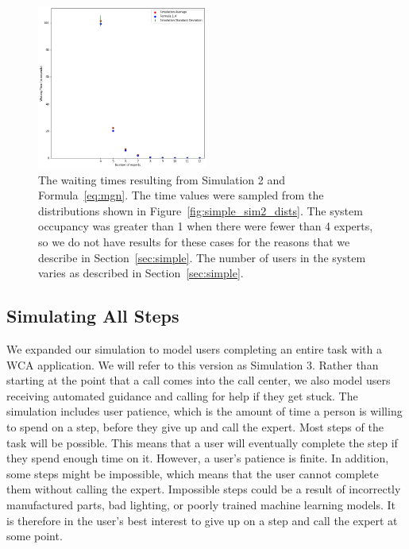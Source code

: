 \begin{figure}[h]
  \includegraphics[width=0.5\textwidth]{figures/montecarlo/independent_calls_lognorm.png}
  \caption{
    The waiting times resulting from Simulation 2 and Formula~\ref{eq:mgn}.
    The time values were sampled from the distributions shown in
    Figure~\ref{fig:simple_sim2_dists}.
    The system occupancy was greater than 1 when there were fewer than 4
    experts, so we do not have results for these cases for the reasons that we
    describe in Section~\ref{sec:simple}.
    The number of users in the system varies as described in
    Section~\ref{sec:simple}.
  }\label{fig:simple_sim2_results}
\end{figure}

\subsection{Simulating All Steps}

We expanded our simulation to model users completing an entire task with a WCA
application.
We will refer to this version as Simulation 3.
Rather than starting at the point that a call comes into the call center, we
also model users receiving automated guidance and calling for help if they get
stuck.
The simulation includes user patience, which is the amount of time a person is
willing to spend on a step, before they give up and call the expert.
Most steps of the task will be possible.
This means that a user will eventually complete the step if they spend enough
time on it.
However, a user's patience is finite.
In addition, some steps might be impossible, which means that the user cannot
complete them without calling the expert.
Impossible steps could be a result of incorrectly manufactured parts, bad
lighting, or poorly trained machine learning models.
It is therefore in the user's best interest to give up on a step and call the
expert at some point.

